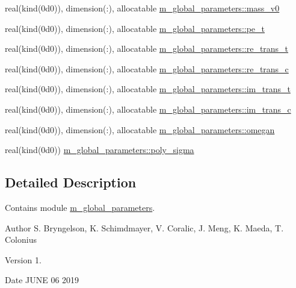 \begin{Indent}
\begin{DoxyCompactItemize}
\item 
real(kind(0d0)), dimension(\+:), allocatable \hyperlink{namespacem__global__parameters_a6a06981be6cdab78452a106009022aa4}{m\+\_\+global\+\_\+parameters\+::mass\+\_\+v0}
\item 
real(kind(0d0)), dimension(\+:), allocatable \hyperlink{namespacem__global__parameters_a8a75928178eef1550c6a0389ff12b44a}{m\+\_\+global\+\_\+parameters\+::pe\+\_\+t}
\item 
real(kind(0d0)), dimension(\+:), allocatable \hyperlink{namespacem__global__parameters_ae0e61a10cd5b33db394052fbefee2681}{m\+\_\+global\+\_\+parameters\+::re\+\_\+trans\+\_\+t}
\item 
real(kind(0d0)), dimension(\+:), allocatable \hyperlink{namespacem__global__parameters_a666c8f5f6663ab81f55c2298e642a3a9}{m\+\_\+global\+\_\+parameters\+::re\+\_\+trans\+\_\+c}
\item 
real(kind(0d0)), dimension(\+:), allocatable \hyperlink{namespacem__global__parameters_a62b213889b2dc5da7d81e7fa636231f6}{m\+\_\+global\+\_\+parameters\+::im\+\_\+trans\+\_\+t}
\item 
real(kind(0d0)), dimension(\+:), allocatable \hyperlink{namespacem__global__parameters_aa93addd83f0134aaaf319ca2b743233c}{m\+\_\+global\+\_\+parameters\+::im\+\_\+trans\+\_\+c}
\item 
real(kind(0d0)), dimension(\+:), allocatable \hyperlink{namespacem__global__parameters_ae152b49c742928bc52f6da61dd805693}{m\+\_\+global\+\_\+parameters\+::omegan}
\item 
real(kind(0d0)) \hyperlink{namespacem__global__parameters_a29164826db891e5662ce2bccdbc57d3c}{m\+\_\+global\+\_\+parameters\+::poly\+\_\+sigma}
\end{DoxyCompactItemize}
\end{Indent}


\subsection{Detailed Description}
Contains module \hyperlink{namespacem__global__parameters}{m\+\_\+global\+\_\+parameters}. 

\begin{DoxyAuthor}{Author}
S. Bryngelson, K. Schimdmayer, V. Coralic, J. Meng, K. Maeda, T. Colonius 
\end{DoxyAuthor}
\begin{DoxyVersion}{Version}
1. 
\end{DoxyVersion}
\begin{DoxyDate}{Date}
J\+U\+NE 06 2019 
\end{DoxyDate}
